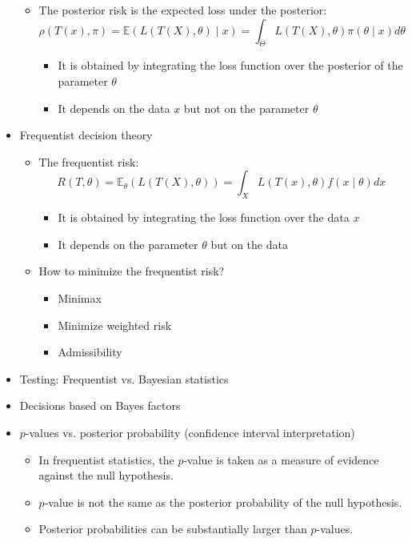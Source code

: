 \documentclass[a4paper]{article}
\begin{document}
\begin{itemize}
\begin{itemize}
        \item The posterior risk is the expected loss under the posterior:
        \[\rho(T(x),\pi)=\mathbb{E}(L(T(X),\theta)\mid x)=\int_{\Theta}L(T(X),\theta)\pi(\theta\mid x)d\theta \]
        \begin{itemize}
            \item It is obtained by integrating the loss function over the posterior of the parameter $\theta$
            \item It depends on the data $x$ but not on the parameter $\theta$
        \end{itemize}
    \end{itemize}
    \item Frequentist decision theory
    \begin{itemize}
        \item The frequentist risk:
        \[R(T,\theta)=\mathbb{E}_{\theta}(L(T(X),\theta))=\int_{X}L(T(x),\theta)f(x\mid\theta)dx \]
        \begin{itemize}
            \item It is obtained by integrating the loss function over the data $x$
            \item It depends on the parameter $\theta$ but on the data
        \end{itemize}
        \item How to minimize the frequentist risk?
        \begin{itemize}
            \item Minimax
            \item Minimize weighted risk
            \item Admissibility
        \end{itemize}
    \end{itemize}
    \item Testing: Frequentist vs. Bayesian statistics
    \item Decisions based on Bayes factors
    \item $p$-values vs. posterior probability (confidence interval interpretation)
    \begin{itemize}
        \item In frequentist statistics, the $p$-value is taken as a measure of evidence against the null hypothesis.
        \item $p$-value is not the same as the posterior probability of the null hypothesis.
        \item Posterior probabilities can be substantially larger than $p$-values.

\end{itemize}
\end{itemize}
\end{document}

